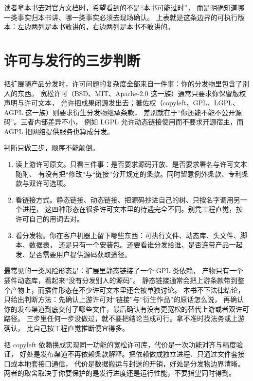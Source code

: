 \documentclass[12pt,a4paper,fontset=fandol]{ctexbook}
\begin{document}
\begin{note}[title={把版本口径当成写作纪律而不是免责声明}]
读者拿本书去对官方文档时，希望看到的不是``本书可能过时''，
而是明确知道哪一类事实归本书讲、哪一类事实必须去现场确认。
上表就是这条边界的可执行版本：左边两列是本书敢讲的，右边两列是本书不敢讲的。
\end{note}

\section{许可与发行的三步判断}

把扩展随产品分发时，许可问题的复杂度全部来自一件事：你的分发物里包含了别人的东西。
宽松许可（BSD、MIT、Apache-2.0 这一族）通常只要求你保留版权声明与许可文本，
允许把成果闭源发出去；著佐权（copyleft，GPL、LGPL、AGPL 这一族）则要求衍生分发物继承条款，
差别就在于``你还能不能不公开源码''。三者内部差异不小，
例如 LGPL 允许动态链接使用而不要求开源宿主，而 AGPL 把网络提供服务也算成分发。

判断只做三步，顺序不能颠倒。

\begin{enumerate}
\item 读上游许可原文。只看三件事：是否要求源码开放、是否要求署名与许可文本随附、
  有没有把``修改''与``链接''分开规定的条款。同时留意例外条款、专利条款与双许可选项。
\item 看链接方式。静态链接、动态链接、把源码抄进自己的树、只按名字调用另一个进程，
  这四种形态在很多许可文本里的待遇完全不同。别凭工程直觉，按许可自己的用词去对。
\item 看分发物。你在客户机器上留下哪些东西：可执行文件、动态库、头文件、脚本、数据表，
  还是只有一个安装包。还要看谁分发给谁、是否连带产品一起发、是否需要用户提供源码获取途径。
\end{enumerate}

\begin{warning}[title={把 copyleft 依赖静态链进闭源插件}]
最常见的一类风险形态是：扩展里静态链接了一个 GPL 类依赖，
产物只有一个插件动态库，看起来``没有分发别人的源码''。
静态链接通常会把上游条款带到整个产物上，而插件形态在不少许可文本里还会被单独讨论。
本书不下法律结论，只给出判断方法：先确认上游许可对``链接''与``衍生作品''的原话怎么说，
再确认你的发布渠道到底交付了哪些文件，最后确认有没有更宽松的替代上游或者双许可路径。
三步里任何一步没做过，就不要把结论当成可行。拿不准时找法务或上游确认，
比自己按工程直觉推断便宜得多。
\end{warning}

\begin{compare}[title={两种常见规避形态的代价差别}]
把 copyleft 依赖换成实现同一功能的宽松许可库，代价是一次功能对齐与精度验证，
好处是发布渠道不再依赖条款解释。把依赖做成独立进程、只通过文件套接口或本地套接口通信，
代价是数据搬运与封送的开销，好处是分发物边界清晰。
两者的取舍取决于你要保护的是发行进度还是运行性能，不要指望同时得到。
\end{compare}
\end{document}
